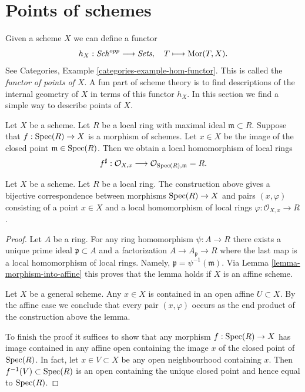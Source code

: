 \section{Points of schemes}
\label{section-points}

\noindent
Given a scheme $X$ we can define a functor
$$
h_X : \mathit{Sch}^{opp}
\longrightarrow
\textit{Sets}, \quad
T \longmapsto \mathop{\mathrm{Mor}}\nolimits(T, X).
$$
See Categories, Example \ref{categories-example-hom-functor}.
This is called the {\it functor of points of $X$}.
A fun part of scheme theory is to find descriptions of
the internal geometry of $X$ in terms of this functor $h_X$.
In this section we find a simple way to describe
points of $X$.

\medskip\noindent
Let $X$ be a scheme. Let $R$ be a local ring with maximal ideal
$\mathfrak m \subset R$. Suppose that $f : \mathop{\mathrm{Spec}}(R) \to X$
is a morphism of schemes. Let $x \in X$ be the image of the closed point
$\mathfrak m \in \mathop{\mathrm{Spec}}(R)$. Then we obtain a local homomorphism
of local rings
$$
f^\sharp :
\mathcal{O}_{X, x}
\longrightarrow
\mathcal{O}_{\mathop{\mathrm{Spec}}(R), \mathfrak m} = R.
$$

\begin{lemma}
\label{lemma-morphism-from-spec-local-ring}
Let $X$ be a scheme. Let $R$ be a local ring.
The construction above gives a bijective correspondence
between morphisms $\mathop{\mathrm{Spec}}(R) \to X$ and pairs
$(x, \varphi)$ consisting of a point $x \in X$ and
a local homomorphism of local rings $\varphi : \mathcal{O}_{X, x} \to R$.
\end{lemma}

\begin{proof}
Let $A$ be a ring. For any ring homomorphism $\psi : A \to R$
there exists a unique prime ideal $\mathfrak p \subset A$
and a factorization $A \to A_{\mathfrak p} \to R$ where the
last map is a local homomorphism of local rings. Namely,
$\mathfrak p = \psi^{-1}(\mathfrak m)$. Via
Lemma \ref{lemma-morphism-into-affine}
this proves that the lemma holds if $X$ is an affine scheme.

\medskip\noindent
Let $X$ be a general scheme. Any $x \in X$ is contained in
an open affine $U \subset X$. By the affine case we conclude that every pair
$(x, \varphi)$ occurs as the end product of the construction
above the lemma.

\medskip\noindent
To finish the proof it suffices to show that any morphism
$f : \mathop{\mathrm{Spec}}(R) \to X$ has image contained in any affine
open containing the image $x$ of the closed
point of $\mathop{\mathrm{Spec}}(R)$. In fact, let $x \in V \subset X$
be any open neighbourhood containing $x$. Then
$f^{-1}(V) \subset \mathop{\mathrm{Spec}}(R)$ is an open containing
the unique closed point and hence equal to $\mathop{\mathrm{Spec}}(R)$.
\end{proof}

